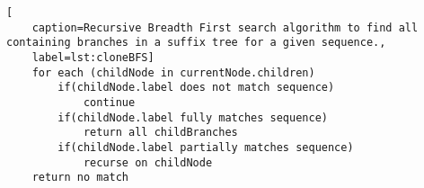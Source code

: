 \copied
\begin{lstlisting}[
	caption=Recursive Breadth First search algorithm to find all containing branches in a suffix tree for a given sequence.,
	label=lst:cloneBFS] 
	for each (childNode in currentNode.children)
		if(childNode.label does not match sequence)
			continue
		if(childNode.label fully matches sequence)
			return all childBranches
		if(childNode.label partially matches sequence)
			recurse on childNode
	return no match
\end{lstlisting}